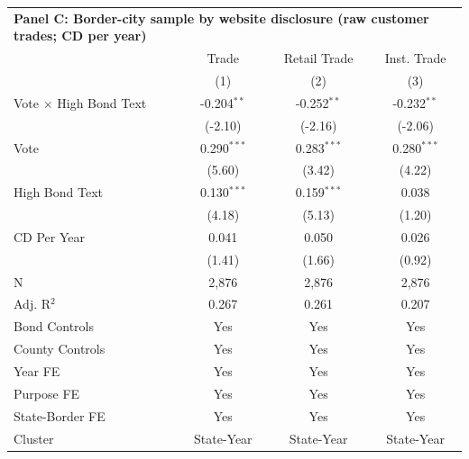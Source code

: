 \begingroup
\centering
\begin{tabular*}{\textwidth}{@{\extracolsep{\fill}}lccc}
\multicolumn{5}{l}{\textbf{Panel C: Border-city sample by website disclosure (raw customer trades; CD per year)}}\\

\addlinespace
   \toprule
                                 & Trade         & Retail Trade  & Inst. Trade\\  
                                 & (1)           & (2)           & (3)\\  
   \midrule 
   Vote $\times$ High Bond Text  & -0.204$^{**}$ & -0.252$^{**}$ & -0.232$^{**}$\\   
                                 & (-2.10)      & (-2.16)      & (-2.06)\\   
   Vote                          & 0.290$^{***}$ & 0.283$^{***}$ & 0.280$^{***}$\\   
                                 & (5.60)       & (3.42)       & (4.22)\\   
   High Bond Text                & 0.130$^{***}$ & 0.159$^{***}$ & 0.038\\   
                                 & (4.18)       & (5.13)       & (1.20)\\   
   CD Per Year                   & 0.041         & 0.050         & 0.026\\   
                                 & (1.41)       & (1.66)       & (0.92)\\   
   \hline
   N                  & 2,876         & 2,876         & 2,876\\  
   Adj. R$^2$                & 0.267         & 0.261         & 0.207\\  
   Bond Controls                 & Yes           & Yes           & Yes\\  
   County Controls               & Yes           & Yes           & Yes\\  
   Year FE                       & Yes           & Yes           & Yes\\  
   Purpose FE                    & Yes           & Yes           & Yes\\  
   State-Border FE               & Yes           & Yes           & Yes\\  
   Cluster              & State-Year & State-Year & State-Year\\  
   \bottomrule
\end{tabular*}
\par\endgroup

